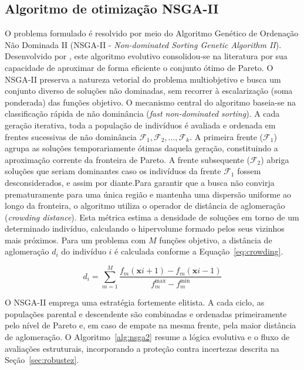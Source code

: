  \subsection{Algoritmo de otimização NSGA-II} \label{sec:nsga2}
 
 O problema formulado é resolvido por meio do Algoritmo Genético de Ordenação Não Dominada II (NSGA-II - \textit{Non-dominated Sorting Genetic Algorithm II}). Desenvolvido por \textcite{DEB2009}, este algoritmo evolutivo consolidou-se na literatura por sua capacidade de aproximar de forma eficiente o conjunto ótimo de Pareto. 
 O NSGA-II preserva a natureza vetorial do problema multiobjetivo e busca um conjunto diverso de soluções não dominadas, sem recorrer à escalarização (soma ponderada) das funções objetivo. O mecanismo central do algoritmo baseia-se na classificação rápida de não dominância (\textit{fast non-dominated sorting}). A cada geração iterativa, toda a população de indivíduos é avaliada e ordenada em frentes sucessivas de não dominância $\mathcal{F}_1, \mathcal{F}_2, \ldots, \mathcal{F}_k$. A primeira frente ($\mathcal{F}_1$) agrupa as soluções temporariamente ótimas daquela geração, constituindo a aproximação corrente da fronteira de Pareto. 
 A frente subsequente ($\mathcal{F}_2$) abriga soluções que seriam dominantes caso os indivíduos da frente $\mathcal{F}_1$ fossem desconsiderados, e assim por diante.Para garantir que a busca não convirja prematuramente para uma única região e mantenha uma dispersão uniforme ao longo da fronteira, o algoritmo utiliza o operador de distância de aglomeração (\textit{crowding distance}). Esta métrica estima a densidade de soluções em torno de um determinado indivíduo, calculando o hipervolume formado pelos seus vizinhos mais próximos. Para um problema com $M$ funções objetivo, a distância de aglomeração $d_i$ do indivíduo $i$ é calculada conforme a Equação~\eqref{eq:crowding}.
 
 \begin{equation}d_i = \sum_{m=1}^{M} \frac{f_m(\mathbf{x}{i+1}) - f_m(\mathbf{x}{i-1})}{f_m^{\max} - f_m^{\min}}
 \label{eq:crowding}
 \end{equation}
 
 O NSGA-II emprega uma estratégia fortemente elitista. A cada ciclo, as populações parental e descendente são combinadas e ordenadas primeiramente pelo nível de Pareto e, em caso de empate na mesma frente, pela maior distância de aglomeração. O Algoritmo~\ref{alg:nsga2} resume a lógica evolutiva e o fluxo de avaliações estruturais, incorporando a proteção contra incertezas descrita na Seção~\ref{sec:robustez}.
 
